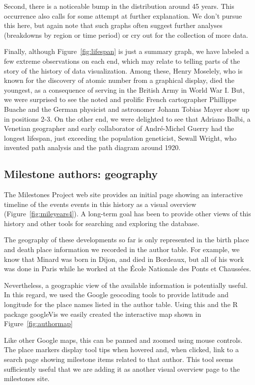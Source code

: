 \documentclass[11pt]{article}
\newcommand*{\figref}[1]{Figure~\ref{#1}}
\begin{document}
Second, there is a noticeable bump in the distribution around 45 years. This
occurrence also calls for some attempt at further explanation.
We don't pursue this here, but again note that such graphs often suggest
further analyses (breakdowns by region or time period)
or cry out for the collection of more data.

Finally, although \figref{fig:lifespan} is just a summary graph, we have labeled a few
extreme observations on each end, which may relate to telling parts of the story of the
history of data visualization.  Among these, Henry Moselely, who is known for the
discovery of atomic number from a graphical display, died the youngest, as a consequence
of serving in the British Army in World War I. But, we were surprised to see
the noted and prolific French cartographer Phillippe Buache
and the German physicist and astronomer Johann Tobias Mayer show up in positions
2-3.  On the other end, we were delighted to see that Adriano Balbi,
a Venetian geographer and early collaborator of Andr{\'e}-Michel Guerry
\citep{BalbiGuerry:1829} had the longest lifespan,
just exceeding the population geneticist, Sewall Wright, who invented
path analysis and the path diagram around 1920.

\subsection{Milestone authors: geography}\label{sec:geography}
The Milestones Project web site provides an initial page showing an interactive timeline
of the events events in this history as a visual overview (\figref{fig:mileyears4}).
A long-term goal has been to
provide other views of this history and other tools for searching and exploring the
database.

The geography of these developments so far is only represented in the birth place
and death place information we recorded in the author table.
For example, we know that Minard was born in Dijon, and died in Bordeaux, but
all of his work was done in Paris while he worked at the
{\'E}cole Nationale des Ponts et Chauss{\'e}es.

Nevertheless, a geographic view of the available information is potentially useful.
In this regard, we used the Google geocoding tools to provide latitude and
longitude for the place names listed in the author table.  Using this and the
R package googleVis \citep{googleVis} we easily created the interactive map shown
in \figref{fig:authormap}

Like other Google maps, this can be panned and zoomed using mouse controls.
The place markers display tool tips when hovered and, when clicked, link to
a search page showing milestone items related to that author.
This tool seems sufficiently useful that we are adding it as another visual
overview page to the milestones site.
\end{document}
